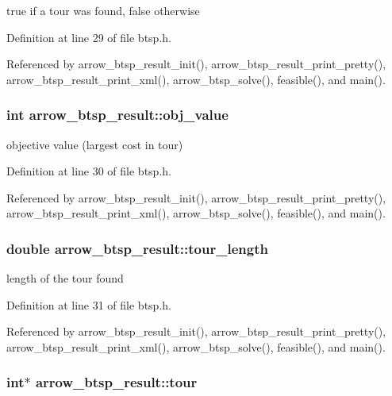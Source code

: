 true if a tour was found, false otherwise 

Definition at line 29 of file btsp.h.

Referenced by arrow\_\-btsp\_\-result\_\-init(), arrow\_\-btsp\_\-result\_\-print\_\-pretty(), arrow\_\-btsp\_\-result\_\-print\_\-xml(), arrow\_\-btsp\_\-solve(), feasible(), and main().\hypertarget{structarrow__btsp__result_ea5f7f45bf61f33ca6b57829da92e041}{
\subsubsection{\setlength{\rightskip}{0pt plus 5cm}int {\bf arrow\_\-btsp\_\-result::obj\_\-value}}}
\label{structarrow__btsp__result_ea5f7f45bf61f33ca6b57829da92e041}


objective value (largest cost in tour) 

Definition at line 30 of file btsp.h.

Referenced by arrow\_\-btsp\_\-result\_\-init(), arrow\_\-btsp\_\-result\_\-print\_\-pretty(), arrow\_\-btsp\_\-result\_\-print\_\-xml(), arrow\_\-btsp\_\-solve(), feasible(), and main().\hypertarget{structarrow__btsp__result_3c0b8827a873df71166e7fe9419c45c2}{
\subsubsection{\setlength{\rightskip}{0pt plus 5cm}double {\bf arrow\_\-btsp\_\-result::tour\_\-length}}}
\label{structarrow__btsp__result_3c0b8827a873df71166e7fe9419c45c2}


length of the tour found 

Definition at line 31 of file btsp.h.

Referenced by arrow\_\-btsp\_\-result\_\-init(), arrow\_\-btsp\_\-result\_\-print\_\-pretty(), arrow\_\-btsp\_\-result\_\-print\_\-xml(), arrow\_\-btsp\_\-solve(), feasible(), and main().\hypertarget{structarrow__btsp__result_ebd9a553dc3bf31f52eda0b293b0e272}{
\subsubsection{\setlength{\rightskip}{0pt plus 5cm}int$\ast$ {\bf arrow\_\-btsp\_\-result::tour}}}
\label{structarrow__btsp__result_ebd9a553dc3bf31f52eda0b293b0e272}


